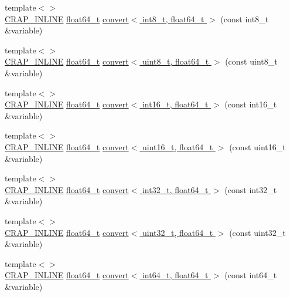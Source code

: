 \begin{DoxyCompactItemize}
{\footnotesize template$<$$>$ }\\\hyperlink{config__x86_8h_a5a40526b8d842e7ff731509998bb0f1c}{C\+R\+A\+P\+\_\+\+I\+N\+L\+I\+N\+E} \hyperlink{crap__types_8h_ac55f3ae81b5bc9053760baacf57e47f4}{float64\+\_\+t} \hyperlink{namespacecrap_a3abb463a5f5089e01e57c001dd85848a}{convert$<$ int8\+\_\+t, float64\+\_\+t $>$} (const int8\+\_\+t \&variable)
\item 
{\footnotesize template$<$$>$ }\\\hyperlink{config__x86_8h_a5a40526b8d842e7ff731509998bb0f1c}{C\+R\+A\+P\+\_\+\+I\+N\+L\+I\+N\+E} \hyperlink{crap__types_8h_ac55f3ae81b5bc9053760baacf57e47f4}{float64\+\_\+t} \hyperlink{namespacecrap_afdb5fc94fcd1aa7a7ba2ba024c1d5cd3}{convert$<$ uint8\+\_\+t, float64\+\_\+t $>$} (const uint8\+\_\+t \&variable)
\item 
{\footnotesize template$<$$>$ }\\\hyperlink{config__x86_8h_a5a40526b8d842e7ff731509998bb0f1c}{C\+R\+A\+P\+\_\+\+I\+N\+L\+I\+N\+E} \hyperlink{crap__types_8h_ac55f3ae81b5bc9053760baacf57e47f4}{float64\+\_\+t} \hyperlink{namespacecrap_afe51c56a156af2a8b9b95a31e9b1c3ad}{convert$<$ int16\+\_\+t, float64\+\_\+t $>$} (const int16\+\_\+t \&variable)
\item 
{\footnotesize template$<$$>$ }\\\hyperlink{config__x86_8h_a5a40526b8d842e7ff731509998bb0f1c}{C\+R\+A\+P\+\_\+\+I\+N\+L\+I\+N\+E} \hyperlink{crap__types_8h_ac55f3ae81b5bc9053760baacf57e47f4}{float64\+\_\+t} \hyperlink{namespacecrap_adc836efacbd81c9ddbfa77aa737186c3}{convert$<$ uint16\+\_\+t, float64\+\_\+t $>$} (const uint16\+\_\+t \&variable)
\item 
{\footnotesize template$<$$>$ }\\\hyperlink{config__x86_8h_a5a40526b8d842e7ff731509998bb0f1c}{C\+R\+A\+P\+\_\+\+I\+N\+L\+I\+N\+E} \hyperlink{crap__types_8h_ac55f3ae81b5bc9053760baacf57e47f4}{float64\+\_\+t} \hyperlink{namespacecrap_aaf6c71939e5941484b4c6a145985b7a6}{convert$<$ int32\+\_\+t, float64\+\_\+t $>$} (const int32\+\_\+t \&variable)
\item 
{\footnotesize template$<$$>$ }\\\hyperlink{config__x86_8h_a5a40526b8d842e7ff731509998bb0f1c}{C\+R\+A\+P\+\_\+\+I\+N\+L\+I\+N\+E} \hyperlink{crap__types_8h_ac55f3ae81b5bc9053760baacf57e47f4}{float64\+\_\+t} \hyperlink{namespacecrap_ab0354af840bafa0d745b9ceffdf7387a}{convert$<$ uint32\+\_\+t, float64\+\_\+t $>$} (const uint32\+\_\+t \&variable)
\item 
{\footnotesize template$<$$>$ }\\\hyperlink{config__x86_8h_a5a40526b8d842e7ff731509998bb0f1c}{C\+R\+A\+P\+\_\+\+I\+N\+L\+I\+N\+E} \hyperlink{crap__types_8h_ac55f3ae81b5bc9053760baacf57e47f4}{float64\+\_\+t} \hyperlink{namespacecrap_aaa3dea60ffb48a7f8f586f6d3e317e75}{convert$<$ int64\+\_\+t, float64\+\_\+t $>$} (const int64\+\_\+t \&variable)

\end{DoxyCompactItemize}
